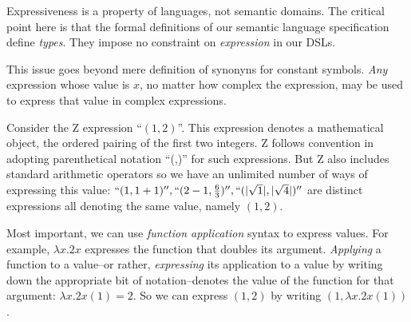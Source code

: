 \documentclass[12pt]{tufte-handout}
\numberwithin{equation}{subsection}
\numberwithin{equation}{subsection}
\begin{document}
Expressiveness is a property of languages, not semantic domains.  The
critical point here is that the formal definitions of our semantic
language specification define \textit{types}.  They impose no
constraint on \textit{expression} in our DSLs.

This issue goes beyond mere definition of synonyns for constant
symbols.  \textit{Any} expression whose value is \(x\), no matter how
complex the expression, may be used to express that value in complex
expressions.


Consider the Z expression ``\((1,2)\)''.  This expression denotes a
mathematical object, the ordered pairing of the first two integers.  Z
follows convention in adopting parenthetical notation ``(,)'' for such
expressions.  But Z also includes standard arithmetic operators so we
have an unlimited number of ways of expressing this value:
\(``(1,1+1)'', ``(2-1,\frac{6}{3})'', ``(|\sqrt{1}|,|\sqrt{4}|)''\)
are distinct expressions all denoting the same value, namely
\((1,2)\).

Most important, we can use \textit{function application} syntax to
express values.  For example, \(\lambda x.2x\) expresses the function
that doubles its argument.  \textit{Applying} a function to a
value--or rather, \textit{expressing} its application to a value by
writing down the appropriate bit of notation--denotes the value of the
function for that argument: \(\lambda x.2x(1) = 2\).  So we can
express \((1,2)\) by writing \((1,\lambda x.2x(1))\).
\end{document}
